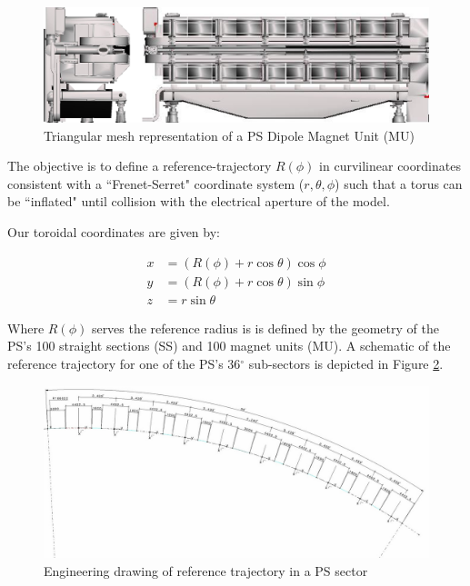 \begin{figure}
    \centering
    \includegraphics{figs/ps_magnet.png}
    \caption{Triangular mesh representation of a PS Dipole Magnet Unit (MU)}
    \label{fig:ps_mu}
\end{figure}

The objective is to define a reference-trajectory $R(\phi)$ in curvilinear coordinates consistent with a ``Frenet-Serret" coordinate system ($r,\theta,\phi$) such that a torus can be ``inflated" until collision with the electrical aperture of the model. 

Our toroidal coordinates are given by:

$$\begin{aligned}
        x & = (R(\phi)+r\cos\theta)\cos\phi \\
        y & = (R(\phi)+r\cos\theta)\sin\phi \\
        z & = r\sin\theta
    \end{aligned}$$

Where $R(\phi)$ serves the reference radius is is defined by the geometry of the PS's 100 straight sections (SS) and 100 magnet units (MU). A schematic of the reference trajectory for one of the PS's 36$^\circ$ sub-sectors is depicted in Figure \ref{fig:ref_traj}.

\begin{figure}
    \centering
    \includegraphics{figs/reference_trajectory_path.jpg}
    \caption{Engineering drawing of reference trajectory in a PS sector}
    \label{fig:ref_traj}
\end{figure}

